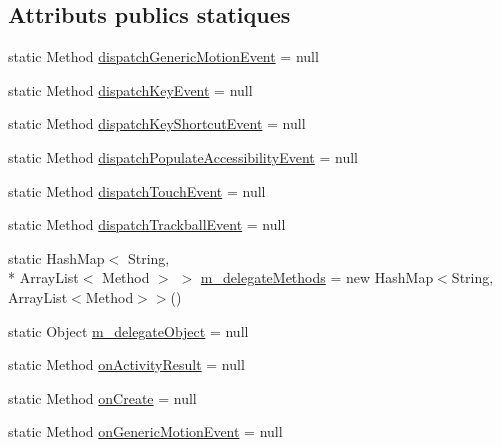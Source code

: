 \subsection*{Attributs publics statiques}
\begin{DoxyCompactItemize}
\item 
static Method \hyperlink{classorg_1_1qtproject_1_1qt5_1_1android_1_1bindings_1_1_qt_application_a2c2d0ff311ded8aaa6dabdde99632a6c}{dispatch\-Generic\-Motion\-Event} = null
\item 
static Method \hyperlink{classorg_1_1qtproject_1_1qt5_1_1android_1_1bindings_1_1_qt_application_a970719713bf7310b041b31dd6415fdcb}{dispatch\-Key\-Event} = null
\item 
static Method \hyperlink{classorg_1_1qtproject_1_1qt5_1_1android_1_1bindings_1_1_qt_application_aa2fb7f374d9a03d6b939375933ff5149}{dispatch\-Key\-Shortcut\-Event} = null
\item 
static Method \hyperlink{classorg_1_1qtproject_1_1qt5_1_1android_1_1bindings_1_1_qt_application_a263117be3577f4976dc349a550cdb73f}{dispatch\-Populate\-Accessibility\-Event} = null
\item 
static Method \hyperlink{classorg_1_1qtproject_1_1qt5_1_1android_1_1bindings_1_1_qt_application_aa76cf4fe4b2ccebdca957464b7411745}{dispatch\-Touch\-Event} = null
\item 
static Method \hyperlink{classorg_1_1qtproject_1_1qt5_1_1android_1_1bindings_1_1_qt_application_acb66b3d0eafb07d1f13fb0a7ca4262bf}{dispatch\-Trackball\-Event} = null
\item 
static Hash\-Map$<$ String, \\*
Array\-List$<$ Method $>$ $>$ \hyperlink{classorg_1_1qtproject_1_1qt5_1_1android_1_1bindings_1_1_qt_application_a5b32c9d8ce150fc1866812b13debbcfb}{m\-\_\-delegate\-Methods} = new Hash\-Map$<$String, Array\-List$<$Method$>$$>$()
\item 
static Object \hyperlink{classorg_1_1qtproject_1_1qt5_1_1android_1_1bindings_1_1_qt_application_a8b778a94cf5468dfc07ae8f3e8d81148}{m\-\_\-delegate\-Object} = null
\item 
static Method \hyperlink{classorg_1_1qtproject_1_1qt5_1_1android_1_1bindings_1_1_qt_application_a6538f4bbf7fdf3a1eba5971bb830af71}{on\-Activity\-Result} = null
\item 
static Method \hyperlink{classorg_1_1qtproject_1_1qt5_1_1android_1_1bindings_1_1_qt_application_a2bd84d3f02531e21ab7434cd4d48b849}{on\-Create} = null
\item 
static Method \hyperlink{classorg_1_1qtproject_1_1qt5_1_1android_1_1bindings_1_1_qt_application_a2ba7755a97e7fadf952401719ca1f8e4}{on\-Generic\-Motion\-Event} = null
$$
\end{DoxyCompactItemize}
